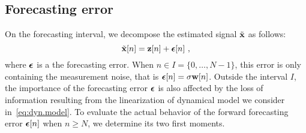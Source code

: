 \subsection{Forecasting error}
On the forecasting interval, we decompose the estimated signal $\tilde{{\mathbf x}}$ as follows:
\begin{equation}
\tilde \bx[n] = \bz[n] + \bepsilon[n]\ ,
\label{eq:forecasting.error}
\end{equation}
where $\boldsymbol{\epsilon}$ is a the forecasting error. When $n\in I=\{0,\dots,N-1\}$, this error is only containing the measurement noise, that is $\boldsymbol{\epsilon}[n]=\sigma{\mathbf w}[n]$. Outside the interval $I$, the importance of the forecasting error $\boldsymbol{\epsilon}$ is also affected by the loss of information resulting from the linearization of dynamical model we consider in~\eqref{eq:dyn.model}. To evaluate the actual behavior of the forward forecasting error $\boldsymbol{\epsilon}[n]$ when $n\geq N$, we determine its two first moments.
